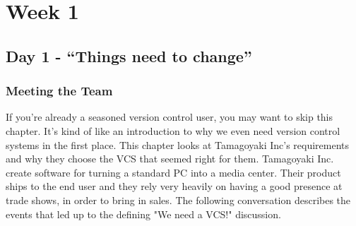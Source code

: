 \chapter{Week 1}
\section{Day 1 - ``Things need to change''}
\subsection{Meeting the Team}

If you're already a seasoned version control user, you may want to skip this chapter.  It's kind of like an introduction to why we even need version control systems in the first place.  This chapter looks at Tamagoyaki Inc's requirements and why they choose the VCS that seemed right for them.  Tamagoyaki Inc. create software for turning a standard PC into a media center.  Their product ships to the end user and they rely very heavily on having a good presence at trade shows, in order to bring in sales.  The following conversation describes the events that led up to the defining "We need a VCS!" discussion.

